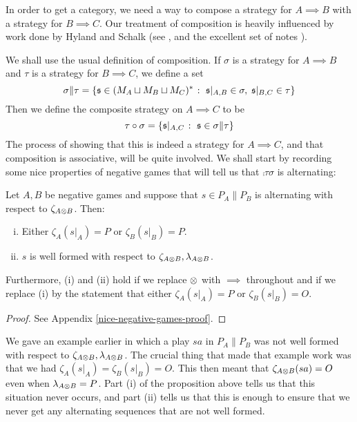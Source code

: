 \documentclass[11pt]{article} %
\begin{document}
In order to get a category, we need a way to compose a strategy for $A\implies B$ with a strategy for $B\implies C$.  Our treatment of composition is heavily influenced by work done by Hyland and Schalk (see \cite{hyland1997games}, \cite{hylandschalkgames} and the excellent set of notes \cite{Schalk2001GsNotes}).  

We shall use the usual definition of composition.  If $\sigma$ is a strategy for $A\implies B$ and $\tau$ is a strategy for $B\implies C$, we define a set
\[
  \sigma\|\tau = \{\mathfrak s\in (M_A \sqcup M_B \sqcup M_C)^*\;\colon\; \mathfrak s\vert_{A,B}\in\sigma,\;\mathfrak s\vert_{B,C}\in\tau\}
  \]
Then we define the composite strategy on $A\implies C$ to be
\[
  \tau \circ \sigma = \{\mathfrak s\vert_{A,C}\;\colon\;\mathfrak s\in\sigma\|\tau\}
  \]
The process of showing that this is indeed a strategy for $A\implies C$, and that composition is associative, will be quite involved.  We shall start by recording some nice properties of negative games that will tell us that $\comp\tau\sigma$ is alternating:

\begin{proposition}
  Let $A,B$ be negative games and suppose that $s\in P_A\|P_B$ is alternating with respect to $\zeta_{A\otimes B}$.  Then:
  \begin{enumerate}[i)]
    \item Either $\zeta_{A}(s\vert_A)=P$ or $\zeta_{B}(s\vert_B)=P$.  
    \item $s$ is well formed with respect to $\zeta_{A\otimes B},\lambda_{A\otimes B}$.  
  \end{enumerate}
  Furthermore, (i) and (ii) hold if we replace $\otimes$ with $\implies$ throughout and if we replace (i) by the statement that either $\zeta_A(s\vert_A)=P$ or $\zeta_B(s\vert_B)=O$.
  \begin{proof}
    See Appendix \ref{nice-negative-games-proof}.
  \end{proof}
  \label{nice-negative-games}
\end{proposition}

We gave an example earlier in which a play $sa$ in $P_A\|P_B$ was not well formed with respect to $\zeta_{A\otimes B},\lambda_{A\otimes B}$.  The crucial thing that made that example work was that we had $\zeta_A(s\vert_A)=\zeta_B(s\vert_B)=O$.  This then meant that $\zeta_{A\otimes B}(sa)=O$ even when $\lambda_{A\otimes B}=P$.  Part (i) of the proposition above tells us that this situation never occurs, and part (ii) tells us that this is enough to ensure that we never get any alternating sequences that are not well formed.
\end{document}
